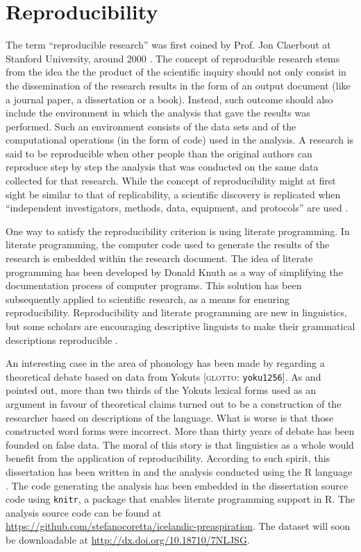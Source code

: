 \documentclass[11pt,a4paper,openany]{memoir}\usepackage[]{graphicx}\usepackage[]{color}
\begin{document}
\section{Reproducibility}
The term ``reproducible research'' was first coined by Prof. Jon Claerbout at Stanford University, around 2000 \citep{fomel2009}.
The concept of reproducible research stems from the idea the the product of the scientific inquiry should not only consist in the dissemination of the research results in the form of an output document (like a journal paper, a dissertation or a book).
Instead, such outcome should also include the environment in which the analysis that gave the results was performed.
Such an environment consists of the data sets and of the computational operations (in the form of code) used in the analysis.
A research is said to be reproducible when other people than the original authors can reproduce step by step the analysis that was conducted on the same data collected for that research.
While the concept of reproducibility might at first sight be similar to that of replicability, a scientific discovery is replicated when ``independent investigators, methods, data, equipment, and protocols'' are used \citep{peng2009}.

One way to satisfy the reproducibility criterion is using literate programming.
In literate programming, the computer code used to generate the results of the research is embedded within the research document.
The idea of literate programming has been developed by Donald Knuth \citep{knuth1984} as a way of simplifying the documentation process of computer programs.
This solution has been subsequently applied to scientific research, as a means for ensuring reproducibility.
Reproducibility and literate programming are new in linguistics, but some scholars are encouraging descriptive linguists to make their grammatical descriptions reproducible \citep{maxwell2005,maxwell2013}.

An interesting case in the area of phonology has been made by \citet{maxwell2013} regarding a theoretical debate based on data from Yokuts [\textsc{glotto}: \texttt{yoku1256}].
As \citet{weigel2002} and \citet{blevins2004a} pointed out, more than two thirds of the Yokuts lexical forms used as an argument in favour of theoretical claims turned out to be a construction of the researcher based on descriptions of the language.
What is worse is that those constructed word forms were incorrect.
More than thirty years of debate has been founded on false data.
The moral of this story is that linguistics as a whole would benefit from the application of reproducibility.
According to such spirit, this dissertation has been written in \XeLaTeX{} and the analysis conducted using the R language \citep{r-core-team2015}. 
The code generating the analysis has been embedded in the dissertation source code using \texttt{knitr}, a package that enables literate programming support in R.
The analysis source code can be found at \url{https://github.com/stefanocoretta/icelandic-preaspiration}.
The dataset will soon be downloadable at \url{http://dx.doi.org/10.18710/7NLJSG}.
\end{document}
